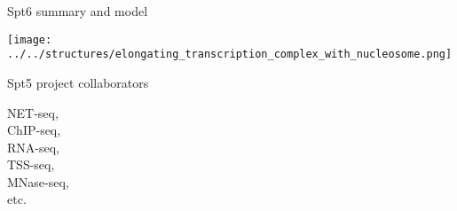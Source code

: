 \documentclass[aspectratio=169, 12pt]{beamer}
\begin{document}
\begin{frame}{Spt6 summary and model}
\end{frame}

\begin{frame}[t,plain]
    \centerline{\texttt{[image: ../../structures/elongating\_transcription\_complex\_with\_nucleosome.png]}}
\end{frame}

\begin{frame}{Spt5 project collaborators}
    \begin{description}[align=right, leftmargin=!, labelwidth=0.5\textwidth]
        \item [Ameet Shetty] NET-seq,\\ChIP-seq,\\RNA-seq,\\TSS-seq,\\MNase-seq,\\etc.
    \end{description}
\end{frame}
\end{document}
